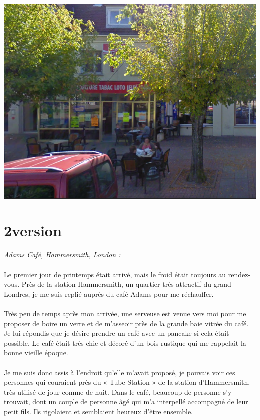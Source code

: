 \begin{center}
\includegraphics[scale=0.5]{BarArcis.PNG}
\end{center}

\section{2\ieme version}
\paragraph{}
\emph{Adams Café, Hammersmith, London :}

\paragraph{}
Le premier jour de printemps était arrivé, mais le froid était toujours au
rendez-vous. Près de la station Hammersmith, un quartier très attractif du
grand Londres, je me suis replié auprès du café Adams pour me réchauffer.

\paragraph{}
Très peu de temps après mon arrivée, une serveuse est venue vers moi pour me
proposer de boire un verre et de m’asseoir près de la grande baie vitrée du
café. Je lui répondis que je désire prendre un café avec un pancake si cela
était possible. Le café était très chic et décoré d’un bois rustique qui me
rappelait la bonne vieille époque.

\paragraph{}
Je me suis donc assis à l’endroit qu’elle m’avait proposé, je pouvais voir ces
personnes qui couraient près du « Tube Station » de la station d’Hammersmith,
très utilisé de jour comme de nuit. Dans le café, beaucoup de personne s’y
trouvait, dont un couple de personne âgé qui m’a interpellé accompagné de leur
petit fils. Ils rigolaient et semblaient heureux d’être ensemble.

